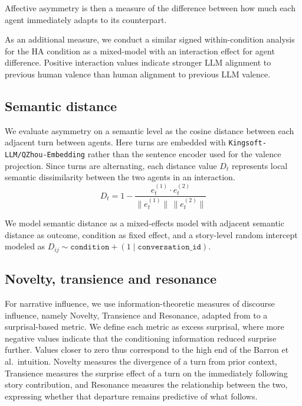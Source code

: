 \documentclass[11pt]{article}
\begin{document}
Affective asymmetry is then a measure of the difference between how much each agent immediately adapts to its counterpart. 

As an additional measure, we conduct a similar signed within-condition analysis for the HA condition as a mixed-model with an interaction effect for agent difference. Positive interaction values indicate stronger LLM alignment to previous human valence than human alignment to previous LLM valence.


\subsection{Semantic distance}
We evaluate asymmetry on a semantic level as the cosine distance between each adjacent turn between agents. Here turns are embedded with \texttt{Kingsoft-LLM/QZhou-Embedding} rather than the sentence encoder used for the valence projection. Since turns are alternating, each distance value $D_t$ represents local semantic dissimilarity between the two agents in an interaction. 
\begin{equation}
    D_t
    =
    1
    -
    \frac{
    e_t^{(1)} \cdot e_t^{(2)}
    }{
    \|e_t^{(1)}\| \, \|e_t^{(2)}\|
    }
\end{equation}

We model semantic distance as a mixed-effects model with adjacent semantic distance as outcome, condition as fixed effect, and a story-level random intercept modeled as $D_{ij} \sim \texttt{condition} + (1 \mid \texttt{conversation\_id})$.

\subsection{Novelty, transience and resonance}
For narrative influence, we use information-theoretic measures of discourse influence, namely Novelty, Transience and Resonance, adapted from \citet{barron2018individuals} to a surprisal-based metric. We define each metric as excess surprisal, where more negative values indicate that the conditioning information reduced surprise further. Values closer to zero thus correspond to the high end of the Barron et al.\ intuition. Novelty measures the divergence of a turn from prior context, Transience measures the surprise effect of a turn on the immediately following story contribution, and Resonance measures the relationship between the two, expressing whether that departure remains predictive of what follows.
\end{document}
